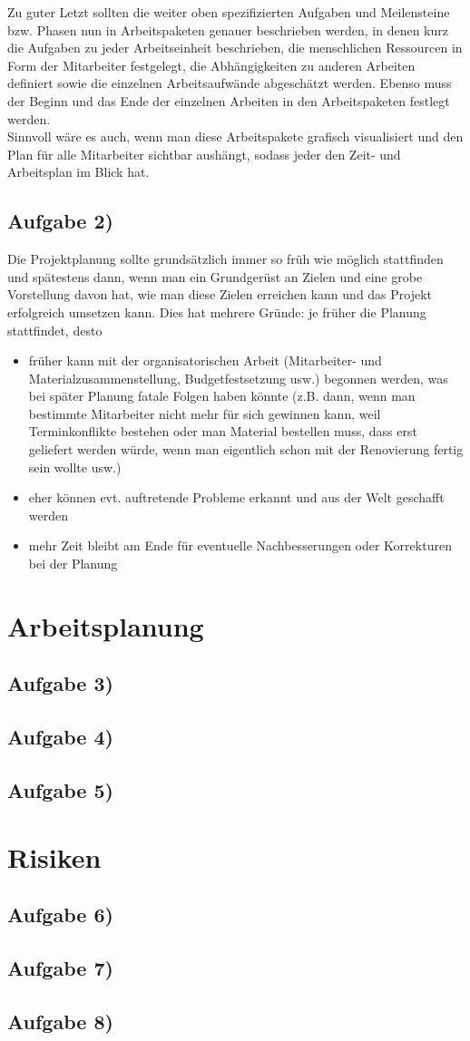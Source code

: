 \documentclass{swp1}
\begin{document}
Zu guter Letzt sollten die weiter oben spezifizierten Aufgaben und Meilensteine bzw. Phasen nun in Arbeitspaketen genauer beschrieben werden, in denen kurz die Aufgaben zu jeder Arbeitseinheit beschrieben, die menschlichen Ressourcen in Form der Mitarbeiter festgelegt, die Abhängigkeiten zu anderen Arbeiten definiert sowie die einzelnen Arbeitsaufwände abgeschätzt werden. Ebenso muss der Beginn und das Ende der einzelnen Arbeiten in den Arbeitspaketen festlegt werden.\\
Sinnvoll wäre es auch, wenn man diese Arbeitspakete grafisch visualisiert und den Plan für alle Mitarbeiter sichtbar aushängt, sodass jeder den Zeit- und Arbeitsplan im Blick hat.

\subsection*{Aufgabe 2)}

Die Projektplanung sollte grundsätzlich immer so früh wie möglich stattfinden und spätestens dann, wenn man ein Grundgerüst an Zielen und eine grobe Vorstellung davon hat, wie man diese Zielen erreichen kann und das Projekt erfolgreich umsetzen kann. Dies hat mehrere Gründe: je früher die Planung stattfindet, desto
\begin{itemize}
\item  früher kann mit der organisatorischen Arbeit (Mitarbeiter- und Materialzusammenstellung, Budgetfestsetzung usw.) begonnen werden, was bei später Planung fatale Folgen haben könnte (z.B. dann, wenn man bestimmte Mitarbeiter nicht mehr für sich gewinnen kann, weil Terminkonflikte bestehen oder man Material bestellen muss, dass erst geliefert werden würde, wenn man eigentlich schon mit der Renovierung fertig sein wollte usw.)
\item eher können evt. auftretende Probleme erkannt und aus der Welt geschafft werden
\item mehr Zeit bleibt am Ende für eventuelle Nachbesserungen oder Korrekturen bei der Planung
\end{itemize}
\newpage

\section*{Arbeitsplanung}          
\subsection*{Aufgabe 3)}
\subsection*{Aufgabe 4)}
\subsection*{Aufgabe 5)}
\section*{Risiken}     
\subsection*{Aufgabe 6)}
\subsection*{Aufgabe 7)}
\subsection*{Aufgabe 8)}
     
\end{document}
